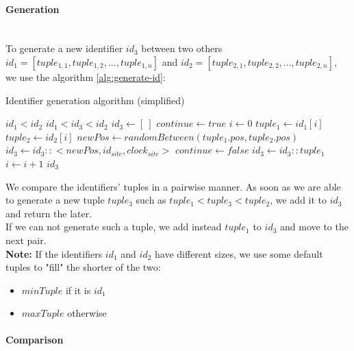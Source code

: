 \documentclass[a4paper]{article}
\begin{document}
\paragraph{Generation} ~\\

To generate a new identifier $id_3$ between two others
$id_1 = [tuple_{1,1}, tuple_{1,2},...,tuple_{1,n}]$ and
$id_2 = [tuple_{2,1}, tuple_{2,2},...,tuple_{2,n}]$,
we use the algorithm \ref{alg:generate-id}:


\begin{algorithm}
  \caption{Identifier generation algorithm (simplified)}\label{alg:generate-id}
  \begin{algorithmic}
      \Require $id_1 < id_2$
      \Ensure $id_1 < id_3 < id_2$
      \Statex
      \State $id_3 \gets [~]$
      \State $continue \gets true$
      \State $i \gets 0$
        \State $tuple_1 \gets id_1[i]$
        \State $tuple_2 \gets id_2[i]$
          \State $newPos \gets randomBetween(tuple_1.pos, tuple_2.pos)$
          \State $id_3 \gets id_3 :: <newPos, id_{site}, clock_{site}>$
          \State $continue \gets false$
        \Else
          \State $id_3 \gets id_3 :: tuple_1$
        \EndIf
        \State $i \gets i+1$
      \EndWhile
      \State \Return $id_3$
    \EndFunction
  \end{algorithmic}
\end{algorithm}


We compare the identifiers' tuples in a pairwise manner.
As soon as we are able to generate a new tuple $tuple_3$ such as $tuple_1 < tuple_3 < tuple_2$,
we add it to $id_3$ and return the later.
\\
If we can not generate such a tuple,
we add instead $tuple_1$ to $id_3$ and move to the next pair.
\\
\textbf{Note:} If the identifiers $id_1$ and $id_2$ have different sizes,
we use some default tuples to "fill" the shorter of the two:
\begin{itemize}
  \item $minTuple$ if it is $id_1$
  \item $maxTuple$ otherwise
\end{itemize}

\paragraph{Comparison} ~\\
\end{document}
